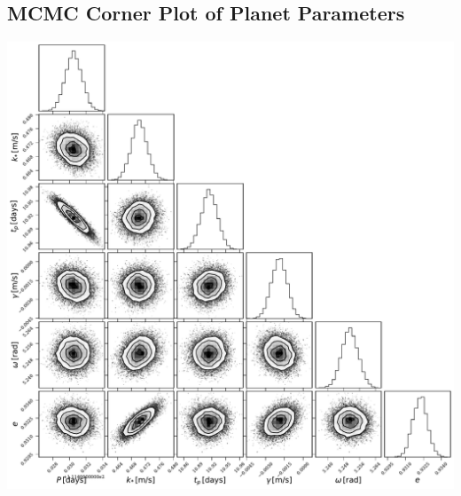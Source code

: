 \documentclass[12pt, letterpaper, twoside]{article}
\begin{document}
\clearpage

\begin{center}
    \section*{MCMC Corner Plot of Planet Parameters}
    \includegraphics[width=\textwidth]{figures/mcmc_corner.pdf}
\end{center}
\end{document}
